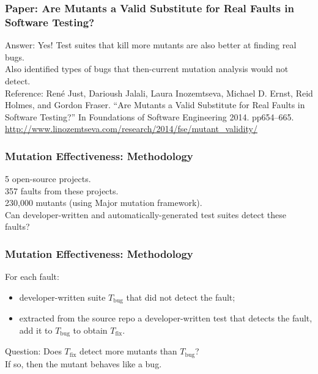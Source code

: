 \documentclass{beamer}
\newenvironment{changemargin}[1]{%
  \begin{list}{}{%
    \setlength{\topsep}{0pt}%
    \setlength{\leftmargin}{#1}%
    \setlength{\rightmargin}{1em}
    \setlength{\listparindent}{\parindent}%
    \setlength{\itemindent}{\parindent}%
    \setlength{\parsep}{\parskip}%
  }%
  \item[]}{\end{list}}
\begin{document}
\begin{frame}
  \frametitle{Paper: Are Mutants a Valid Substitute for Real Faults in Software Testing?}


  \begin{changemargin}{2em}
Answer: \alert{Yes!} Test suites
that kill more mutants are also better at finding real bugs. \\[1em]
Also identified types of bugs that then-current mutation analysis would not detect. \\[1em]

\scriptsize
Reference: René Just, Darioush Jalali, Laura Inozemtseva, Michael D. Ernst, Reid Holmes, and
Gordon Fraser. “Are Mutants a Valid Substitute for Real Faults in Software Testing?” In Foundations of Software Engineering 2014. pp654–665. \url{http://www.linozemtseva.com/research/2014/fse/mutant_validity/}\\[1em]
  \end{changemargin}
\end{frame}

\begin{frame}
  \frametitle{Mutation Effectiveness: Methodology}
  \begin{changemargin}{2em}
    5 open-source projects.\\
    357 faults from these projects.\\
    230,000 mutants (using Major mutation framework).\\[1em]
    Can developer-written and automatically-generated test suites detect these faults?
  \end{changemargin}
\end{frame}

\begin{frame}[fragile]
  \frametitle{Mutation Effectiveness: Methodology}
  \begin{changemargin}{2em}
    For each fault:
    \begin{itemize}
    \item developer-written suite $T_{\mbox{bug}}$ that did not detect the fault;
    \item extracted from the source repo a developer-written test that detects the fault, add it to $T_{\mbox{bug}}$  to obtain $T_{\mbox{fix}}$.
    \end{itemize}
    Question: Does $T_{\mbox{fix}}$ detect more mutants than $T_{\mbox{bug}}$?\\
    If so, then the mutant behaves like a bug.

  \end{changemargin}
\end{frame}
\end{document}
